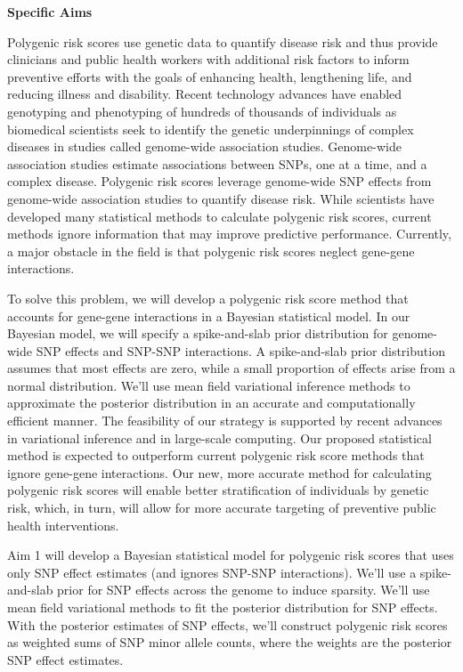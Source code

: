 \documentclass[
  11pt,
  letterpaper,
  DIV=11,
  numbers=noendperiod]{scrartcl}
\author{}
\date{}
\begin{document}
\ifdefined\Shaded\renewenvironment{Shaded}{\begin{tcolorbox}[boxrule=0pt, sharp corners, frame hidden, borderline west={3pt}{0pt}{shadecolor}, breakable, interior hidden, enhanced]}{\end{tcolorbox}}\fi

\textbf{Specific Aims}

Polygenic risk scores use genetic data to quantify disease risk and thus
provide clinicians and public health workers with additional risk
factors to inform preventive efforts with the goals of enhancing health,
lengthening life, and reducing illness and disability. Recent technology
advances have enabled genotyping and phenotyping of hundreds of
thousands of individuals as biomedical scientists seek to identify the
genetic underpinnings of complex diseases in studies called genome-wide
association studies. Genome-wide association studies estimate
associations between SNPs, one at a time, and a complex disease.
Polygenic risk scores leverage genome-wide SNP effects from genome-wide
association studies to quantify disease risk. While scientists have
developed many statistical methods to calculate polygenic risk scores,
current methods ignore information that may improve predictive
performance. Currently, a major obstacle in the field is that polygenic
risk scores neglect gene-gene interactions.

To solve this problem, we will develop a polygenic risk score method
that accounts for gene-gene interactions in a Bayesian statistical
model. In our Bayesian model, we will specify a spike-and-slab prior
distribution for genome-wide SNP effects and SNP-SNP interactions. A
spike-and-slab prior distribution assumes that most effects are zero,
while a small proportion of effects arise from a normal distribution.
We'll use mean field variational inference methods to approximate the
posterior distribution in an accurate and computationally efficient
manner. The feasibility of our strategy is supported by recent advances
in variational inference and in large-scale computing. Our proposed
statistical method is expected to outperform current polygenic risk
score methods that ignore gene-gene interactions. Our new, more accurate
method for calculating polygenic risk scores will enable better
stratification of individuals by genetic risk, which, in turn, will
allow for more accurate targeting of preventive public health
interventions.

Aim 1 will develop a Bayesian statistical model for polygenic risk
scores that uses only SNP effect estimates (and ignores SNP-SNP
interactions). We'll use a spike-and-slab prior for SNP effects across
the genome to induce sparsity. We'll use mean field variational methods
to fit the posterior distribution for SNP effects. With the posterior
estimates of SNP effects, we'll construct polygenic risk scores as
weighted sums of SNP minor allele counts, where the weights are the
posterior SNP effect estimates.
\end{document}
